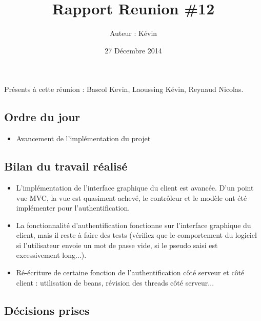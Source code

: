 \documentclass[12pt,a4paper]{article}
\title{Rapport Reunion \#12}
\author{Auteur : Kévin \bsc{LAOUSSING}}
\date{27 Décembre 2014}
\begin{document}
\maketitle

\newpage

Présents à cette réunion : Bascol Kevin, Laoussing Kévin, Reynaud Nicolas.

\subsection*{Ordre du jour}
\begin{itemize}[label = $\blacktriangleright$]
\item Avancement de l'implémentation du projet
\end{itemize}

\subsection*{Bilan du travail réalisé}

\begin{itemize}[label = $\blacktriangleright$]
\item L'implémentation de l'interface graphique du client est avancée.
D'un point vue MVC, la vue est quasiment achevé, le contrôleur et le modèle ont été implémenter pour l'authentification.

\item La fonctionnalité d'authentification fonctionne sur l'interface graphique du client, mais il reste à faire des tests (vérifiez que le comportement du logiciel si l'utilisateur envoie un mot de passe vide, si le pseudo saisi est excessivement long...).

\item Ré-écriture de certaine fonction de l'authentification côté serveur et côté client : utilisation de beans, révision des threads côté serveur...
\end{itemize}


\subsection*{Décisions prises}
\end{document}
